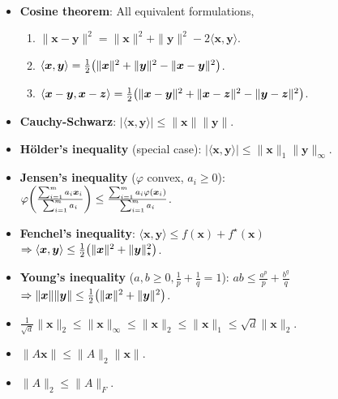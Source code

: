 \documentclass[8pt,a4paper]{extarticle}
\newcommand{\lft}{\mathopen{}\mathclose\bgroup\left}
\newcommand{\rgt}{\aftergroup\egroup\right}
\renewcommand{\vec}[1]{\bm{#1}}
\newcommand{\mat}[1]{#1}
\newenvironment{topic}[1]
{\textbf{\sffamily \colorbox{black}{\rlap{\textbf{\textcolor{white}{#1}}}\hspace{\linewidth}\hspace{-2\fboxsep}}} \\ \vspace{0.2cm}}
{}
\begin{document}
\begin{multicols*}{2}
    \begin{topic}{Lemmas}
        \begin{itemize}
            \item \textbf{Cosine theorem}: All equivalent formulations,
                  \begin{enumerate}
                      \item $\| \vec{x} - \vec{y} \|^2 = \| \vec{x} \|^2 + \| \vec{y} \|^2 - 2 \langle \vec{x}, \vec{y} \rangle$.
                      \item $\langle \vec{x}, \vec{y} \rangle = \frac{1}{2} \lft( \| \vec{x} \|^2 + \| \vec{y} \|^2 - \| \vec{x} - \vec{y} \|^2 \rgt)$.
                      \item $\langle \vec{x} - \vec{y}, \vec{x} - \vec{z} \rangle = \frac{1}{2} \lft( \| \vec{x} - \vec{y} \|^2 + \| \vec{x} - \vec{z} \|^2 - \| \vec{y} - \vec{z} \|^2 \rgt)$.
                  \end{enumerate}
            \item \textbf{Cauchy-Schwarz}: $|\langle \vec{x}, \vec{y} \rangle| \leq \| \vec{x} \| \| \vec{y} \|$.
            \item \textbf{H\"older's inequality} (special case): $|\langle \vec{x}, \vec{y} \rangle| \leq \| \vec{x} \|_1 \| \vec{y} \|_\infty$.
            \item \textbf{Jensen's inequality} ($\varphi$ convex, $a_i \geq 0$): \\ $\varphi \lft( \frac{\sum_{i=1}^{m} a_i \vec{x}_i}{\sum_{i=1}^{m} a_i} \rgt) \leq \frac{\sum_{i=1}^{m} a_i \varphi(\vec{x}_i)}{\sum_{i=1}^{m} a_i}$.
            \item \textbf{Fenchel's inequality}: $\langle \vec{x}, \vec{y} \rangle \leq f(\vec{x}) + f^\star(\vec{x})$ \\ $\Rightarrow \langle \vec{x}, \vec{y} \rangle \leq \frac{1}{2} \lft( \| \vec{x} \|^2 + \| \vec{y} \|^2_\star \rgt)$.
            \item \textbf{Young's inequality} ($a,b \geq 0, \frac{1}{p} + \frac{1}{q} = 1$): $ab \leq \frac{a^p}{p} + \frac{b^q}{q}$ \\ $\Rightarrow \| \vec{x} \| \| \vec{y} \| \leq \frac{1}{2} \lft( \| \vec{x} \|^2 + \| \vec{y} \|^2 \rgt)$.
            \item $\frac{1}{\sqrt{d}} \| \vec{x} \|_2 \leq \| \vec{x} \|_\infty \leq \| \vec{x} \|_2 \leq \| \vec{x} \|_1 \leq \sqrt{d} \| \vec{x} \|_2$.
            \item $\| \mat{A} \vec{x} \| \leq \| \mat{A} \|_2 \| \vec{x} \|$.
            \item $\| \mat{A} \|_2 \leq \| \mat{A} \|_F$.

\end{itemize}
\end{topic}
\end{multicols*}
\end{document}

